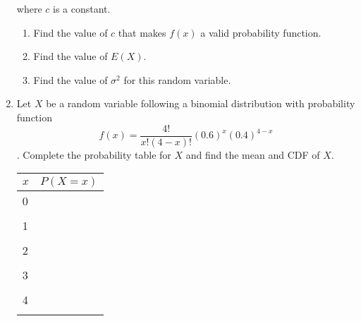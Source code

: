 \documentclass[11pt]{article}\usepackage[]{graphicx}\usepackage[]{color}
\begin{document}
\begin{enumerate}
	where $c$ is a constant.
         \begin{enumerate}
         \item Find the value of $c$ that makes $f(x)$ a valid probability function. \vspace{8em}
         \item Find the value of $E(X)$. \vspace{8em}
         \item Find the value of $\sigma^2$ for this random variable. \vspace{6em}
         \end{enumerate}

	
	\item    Let $X$ be a random variable following a binomial distribution with probability function $$f(x) = \dfrac{4!}{x! (4-x)!} (0.6)^x (0.4)^{4-x} $$.
   Complete the probability table for $X$ and find the mean and CDF of $X$.
   \begin{table}[h!]
   
   \begin{tabular}{l|c}
   $x$ & $P(X=x)$ \\ \hline
   0 & \\
     & \\
   1 & \\
     & \\
   2 & \\
     & \\
   3 & \\
     & \\
   4 & \\
     & \\ \hline
   \end{tabular}
   \end{table}


   \end{enumerate}
\end{document}
